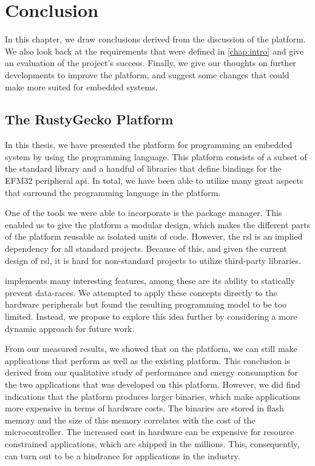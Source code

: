 
\chapter{Conclusion}
\label{chap:conclusion}

In this chapter, we draw conclusions derived from the discussion of the {\rg} platform.
We also look back at the requirements that were defined in \autoref{chap:intro} and give an evaluation of the project's success.
Finally, we give our thoughts on further developments to improve the {\rg} platform, and suggest some changes that could make {\rust} more suited for embedded systems.

\section{The RustyGecko Platform}

In this thesis, we have presented the {\rg} platform for programming an embedded system by using the {\rust} programming language.
This platform consists of a subset of the {\rust} standard library and a handful of libraries that define bindings for the EFM32 peripheral \gls{api}.
In total, we have been able to utilize many great aspects that surround the {\rust} programming language in the {\rg} platform.

One of the tools we were able to incorporate is the {\cargo} package manager.
This enabled us to give the {\rg} platform a modular design, which makes the different parts of the platform reusable as isolated units of code.
However, the \gls{rsl} is an implied dependency for all standard {\rust} projects.
Because of this, and given the current design of \gls{rsl}, it is hard for non-standard projects to utilize third-party libraries.

{\rust} implements many interesting features, among these are its ability to statically prevent data-races.
We attempted to apply these concepts directly to the hardware peripherals but found the resulting programming model to be too limited.
Instead, we propose to explore this idea further by considering a more dynamic approach for future work.

From our measured results, we showed that on the {\rg} platform, we can still make applications that perform as well as the existing {\C} platform.
This conclusion is derived from our qualitative study of performance and energy consumption for the two applications that was developed on this platform.
However, we did find indications that the platform produces larger binaries, which make {\rust} applications more expensive in terms of hardware costs.
The binaries are stored in flash memory and the size of this memory correlates with the cost of the microcontroller.
The increased cost in hardware can be expensive for resource constrained applications, which are shipped in the millions.
This, consequently, can turn out to be a hindrance for applications in the industry.

